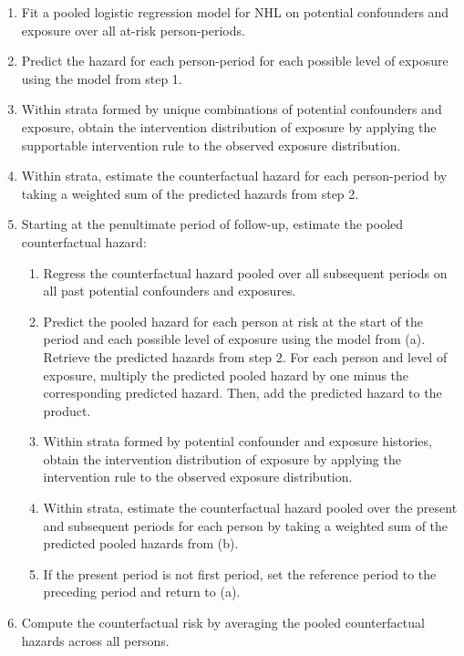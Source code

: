 \documentclass[
  11pt,
  letterpaper,
  DIV=11,
  numbers=noendperiod]{scrartcl}
\providecommand{\tightlist}{%
  \setlength{\itemsep}{0pt}\setlength{\parskip}{0pt}}
\begin{document}
\begin{enumerate}
\def\labelenumi{\arabic{enumi}.}
\item
  Fit a pooled logistic regression model for NHL on potential
  confounders and exposure over all at-risk person-periods.
\item
  Predict the hazard for each person-period for each possible level of
  exposure using the model from step 1.
\item
  Within strata formed by unique combinations of potential confounders
  and exposure, obtain the intervention distribution of exposure by
  applying the supportable intervention rule to the observed exposure
  distribution.
\item
  Within strata, estimate the counterfactual hazard for each
  person-period by taking a weighted sum of the predicted hazards from
  step 2.
\item
  Starting at the penultimate period of follow-up, estimate the pooled
  counterfactual hazard:

  \begin{enumerate}
  \def\labelenumii{\alph{enumii})}
  \tightlist
  \item
    Regress the counterfactual hazard pooled over all subsequent periods
    on all past potential confounders and exposures.
  \item
    Predict the pooled hazard for each person at risk at the start of
    the period and each possible level of exposure using the model from
    (a). Retrieve the predicted hazards from step 2. For each person and
    level of exposure, multiply the predicted pooled hazard by one minus
    the corresponding predicted hazard. Then, add the predicted hazard
    to the product.
  \item
    Within strata formed by potential confounder and exposure histories,
    obtain the intervention distribution of exposure by applying the
    intervention rule to the observed exposure distribution.
  \item
    Within strata, estimate the counterfactual hazard pooled over the
    present and subsequent periods for each person by taking a weighted
    sum of the predicted pooled hazards from (b).
  \item
    If the present period is not first period, set the reference period
    to the preceding period and return to (a).
  \end{enumerate}
\item
  Compute the counterfactual risk by averaging the pooled counterfactual
  hazards across all persons.
\end{enumerate}
\end{document}
